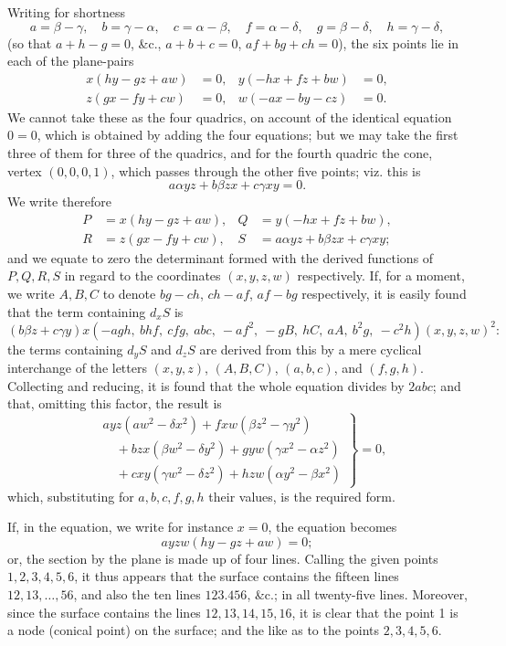 \documentclass[10pt]{article}
\begin{document}
\noindent
Writing for shortness
\[
a=\beta-\gamma,\quad b=\gamma-\alpha,\quad c=\alpha-\beta,\quad
f=\alpha-\delta,\quad g=\beta-\delta,\quad h=\gamma-\delta,
\]
(so that $a+h-g=0$, \&c., $a+b+c=0$, $af+bg+ch=0$), the six points lie in each
of the plane-pairs
\[
\begin{aligned}
x(hy-gz+aw)&=0,        & y(-hx+fz+bw)&=0,\\
z(gx-fy+cw)&=0,        & w(-ax-by-cz)&=0.
\end{aligned}
\]
We cannot take these as the four quadrics, on account of the identical equation
$0=0$, which is obtained by adding the four equations; but we may take the first
three of them for three of the quadrics, and for the fourth quadric the cone,
vertex $(0,0,0,1)$, which passes through the other five points; viz. this is
\[
        a\alpha yz+b\beta zx+c\gamma xy=0.
\]
We write therefore
\[
\begin{aligned}
P&=x(hy-gz+aw),        & Q&=y(-hx+fz+bw),\\
R&=z(gx-fy+cw),        & S&=a\alpha yz+b\beta zx+c\gamma xy;
\end{aligned}
\]
and we equate to zero the determinant formed with the derived functions of
$P,Q,R,S$ in regard to the coordinates $(x,y,z,w)$ respectively. If, for a
moment, we write $A,B,C$ to denote $bg-ch$, $ch-af$, $af-bg$ respectively, it is
easily found that the term containing $d_xS$ is
\[
(b\beta z+c\gamma y)x
(-agh,\ bhf,\ cfg,\ abc,\ -af^2,\ -gB,\ hC,\ aA,\ b^2g,\ -c^2h)(x,y,z,w)^2:
\]
the terms containing $d_yS$ and $d_zS$ are derived from this by a mere cyclical
interchange of the letters $(x,y,z)$, $(A,B,C)$, $(a,b,c)$, and $(f,g,h)$.
Collecting and reducing, it is found that the whole equation divides by $2abc$;
and that, omitting this factor, the result is
\[
\left.
\begin{aligned}
&ayz(aw^2-\delta x^2)+fxw(\beta z^2-\gamma y^2)\\
&\quad + bzx(\beta w^2-\delta y^2)+gyw(\gamma x^2-\alpha z^2)\\
&\quad + cxy(\gamma w^2-\delta z^2)+hzw(\alpha y^2-\beta x^2)
\end{aligned}
\right\}=0,
\]
which, substituting for $a,b,c,f,g,h$ their values, is the required form.

If, in the equation, we write for instance $x=0$, the equation becomes
\[
        ayzw(hy-gz+aw)=0;
\]
or, the section by the plane is made up of four lines. Calling the given points
$1,2,3,4,5,6$, it thus appears that the surface contains the fifteen lines
$12,13,\ldots,56$, and also the ten lines $123.456$, \&c.; in all twenty-five
lines. Moreover, since the surface contains the lines $12,13,14,15,16$, it is
clear that the point 1 is a node (conical point) on the surface; and the like as
to the points $2,3,4,5,6$.
\end{document}
